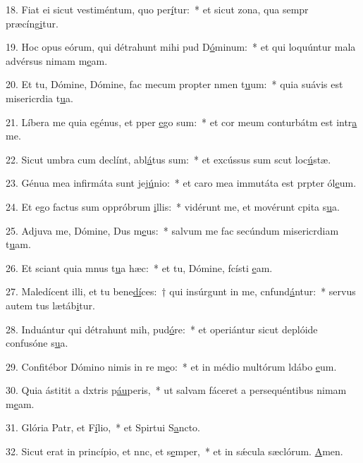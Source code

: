 18. Fiat ei sicut vestiméntum, quo per\uline{í}tur:~* et sicut zona, qua sempr præcíng\uline{i}tur.\par 
19. Hoc opus eórum, qui détrahunt mihi pud D\uline{ó}minum:~* et qui loquúntur mala advérsus nimam m\uline{e}am.\par 
20. Et tu, Dómine, Dómine, fac mecum propter nmen t\uline{u}um:~* quia suávis est misericrdia t\uline{u}a.\par 
21. Líbera me quia egénus, et pper \uline{e}go sum:~* et cor meum conturbátm est intr\uline{a} me.\par 
22. Sicut umbra cum declínt, abl\uline{á}tus sum:~* et excússus sum scut loc\uline{ú}stæ.\par 
23. Génua mea infirmáta sunt  jej\uline{ú}nio:~* et caro mea immutáta est prpter ól\uline{e}um.\par 
24. Et ego factus sum oppróbrum \uline{i}llis:~* vidérunt me, et movérunt cpita s\uline{u}a.\par 
25. Adjuva me, Dómine, Dus m\uline{e}us:~* salvum me fac secúndum misericrdiam t\uline{u}am.\par 
26. Et sciant quia mnus t\uline{u}a hæc:~* et tu, Dómine, fcísti \uline{e}am.\par 
27. Maledícent illi, et tu bene\uline{dí}ces:~† qui insúrgunt in me, cnfund\uline{á}ntur:~* servus autem tus lætáb\uline{i}tur.\par 
28. Induántur qui détrahunt mih, pud\uline{ó}re:~* et operiántur sicut deplóide confusóne s\uline{u}a.\par 
29. Confitébor Dómino nimis in re m\uline{e}o:~* et in médio multórum ldábo \uline{e}um.\par 
30. Quia ástitit a dxtris p\uline{áu}peris,~* ut salvam fáceret a persequéntibus nimam m\uline{e}am.\par 
31. Glória Patr, et F\uline{í}lio,~* et Spirtui S\uline{a}ncto.\par 
32. Sicut erat in princípio, et nnc, et s\uline{e}mper,~* et in sǽcula sæclórum. \uline{A}men.\par 
